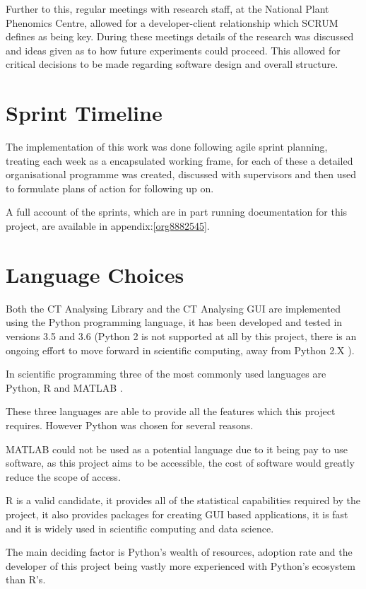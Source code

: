\documentclass[11pt]{report}
\begin{document}
Further to this, regular meetings with research staff, at the National Plant Phenomics Centre,  allowed for a developer-client relationship which SCRUM defines as being key. During these meetings details of the research was discussed and ideas given as to how future experiments could proceed. This allowed for critical decisions to be made regarding software design and overall structure.
\section{Sprint Timeline}
\label{sec:org97b53e3}
The implementation of this work was done following agile sprint planning, treating each week as a encapsulated working frame, for each of these a detailed organisational programme was created, discussed with supervisors and then used to formulate plans of action for following up on.

A full account of the sprints, which are in part running documentation for this project, are available in appendix:\ref{org8882545}.

\section{Language Choices}
\label{sec:org15b2a17}
Both the CT Analysing Library and the CT Analysing GUI are implemented using the Python programming language, it has been developed and tested in versions 3.5 and 3.6 (Python 2 is not supported at all by this project, there is an ongoing effort to move forward in scientific computing, away from Python 2.X  \cite{Ozgur2016}).

In scientific programming three of the most commonly used languages are Python, R and MATLAB \cite{Ozgur2016}.

These three languages are able to provide all the features which this project requires. However Python was chosen for several reasons.

MATLAB could not be used as a potential language due to it being pay to use software, as this project aims to be accessible, the cost of software would greatly reduce the scope of access.

R is a valid candidate, it provides all of the statistical capabilities required by the project, it also provides packages for creating GUI based applications, it is fast and it is widely used in scientific computing and data science.

The main deciding factor is Python's wealth of resources, adoption rate and the developer of this project being vastly more experienced with Python's ecosystem than R's.
\end{document}
